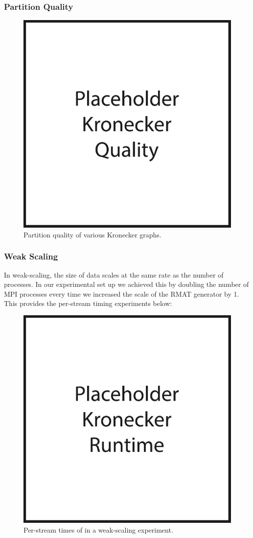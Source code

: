 {\subsubsection{Partition Quality}
\begin{figure}[h!]
\centering
  \includegraphics[width=0.8\columnwidth]{figures/kronecker_quality_tests.pdf}
  \caption{Partition quality of various Kronecker graphs.}
  \label{fig:kronqual}
\end{figure}


\subsubsection{Weak Scaling}
In weak-scaling, the size of data scales at the same rate as the number of processes. In our experimental set up we achieved this by doubling the number of MPI processes every time we increased the scale of the RMAT generator by 1. This provides the per-stream timing experiments below:
\begin{figure}[h!]
\centering
  \includegraphics[width=0.8\columnwidth]{figures/kronecker_speed_tests.pdf}
  \caption{Per-stream times of \ourmethod in a weak-scaling experiment.}
  \label{fig:kronspeed}
\end{figure}

}
